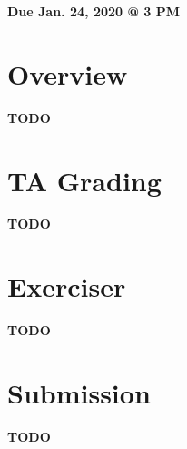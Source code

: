 \documentclass[11pt]{article}
\makeatletter
\def\datedue{Jan. 24, 2020 @ 3 PM}
\makeatother
\begin{document}
\maketitle \thispagestyle{fancy}

\hfill {\large \textbf{Due \datedue}}


\section{Overview}
\label{sec:overview}
\textbf{TODO}

\section{TA Grading}
\label{sec:tagrading}
\textbf{TODO}

\section{Exerciser}
\label{sec:exercise}
\textbf{TODO}

\section{Submission}
\label{sec:submission}
\textbf{TODO}
\end{document}
